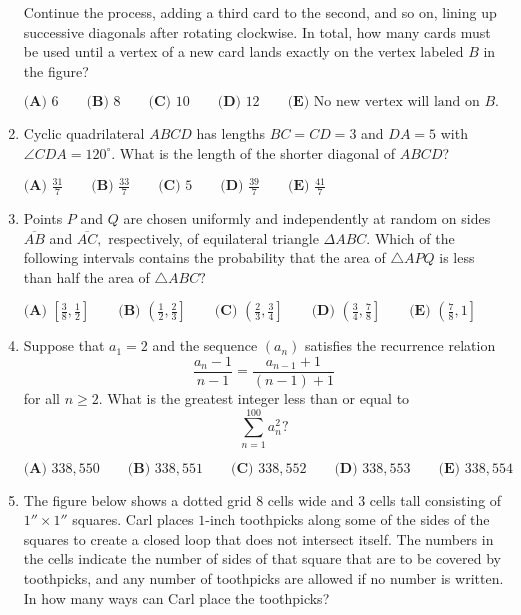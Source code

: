 \documentclass{article}
\begin{document}
\begin{enumerate}[label=\arabic*., itemsep=0.5em]
Continue the process, adding a third card to the second, and so on, lining up successive diagonals after rotating clockwise. In total, how many cards must be used until a vertex of a new card lands exactly on the vertex labeled \(B\) in the figure?

\(\textbf{(A) }6\qquad\textbf{(B) }8\qquad\textbf{(C) }10\qquad\textbf{(D) }12\qquad\textbf{(E) }\text{No new vertex will land on }B.\)\par \vspace{0.5em}\item Cyclic quadrilateral \(ABCD\) has lengths \(BC=CD=3\) and \(DA=5\) with \(\angle CDA=120^\circ\). What is the length of the shorter diagonal of \(ABCD\)?

\(
\textbf{(A) }\frac{31}7 \qquad
\textbf{(B) }\frac{33}7 \qquad
\textbf{(C) }5 \qquad
\textbf{(D) }\frac{39}7 \qquad
\textbf{(E) }\frac{41}7 \qquad
\)\par \vspace{0.5em}\item Points \(P\) and \(Q\) are chosen uniformly and independently at random on sides \(\overline {AB}\) and \(\overline{AC},\) respectively, of equilateral triangle \(\Delta ABC.\) Which of the following intervals contains the probability that the area of \(\triangle APQ\) is less than half the area of \(\triangle ABC?\)

\(\textbf{(A) } \left[\frac 38, \frac 12\right] \qquad \textbf{(B) } \left(\frac 12, \frac 23\right] \qquad \textbf{(C) } \left(\frac 23, \frac 34\right] \qquad \textbf{(D) } \left(\frac 34, \frac 78\right] \qquad \textbf{(E) } \left(\frac 78, 1\right]\)\par \vspace{0.5em}\item Suppose that \(a_1 = 2\) and the sequence \((a_n)\) satisfies the recurrence relation 
\begin{equation*}
\frac{a_n -1}{n-1}=\frac{a_{n-1}+1}{(n-1)+1}
\end{equation*}
for all \(n \ge 2.\) What is the greatest integer less than or equal to 
\begin{equation*}
\sum^{100}_{n=1} a_n^2?
\end{equation*}

\(\textbf{(A) } 338{,}550 \qquad \textbf{(B) } 338{,}551 \qquad \textbf{(C) } 338{,}552 \qquad \textbf{(D) } 338{,}553 \qquad \textbf{(E) } 338{,}554\)\par \vspace{0.5em}\item The figure below shows a dotted grid \(8\) cells wide and \(3\) cells tall consisting of \(1''\times1''\) squares. Carl places \(1\)-inch toothpicks along some of the sides of the squares to create a closed loop that does not intersect itself. The numbers in the cells indicate the number of sides of that square that are to be covered by toothpicks, and any number of toothpicks are allowed if no number is written. In how many ways can Carl place the toothpicks?



\end{enumerate}
\end{document}

